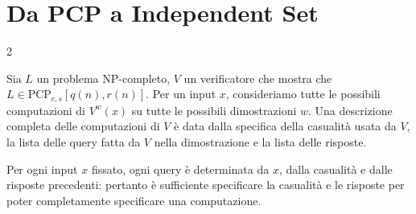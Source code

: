 \documentclass[\main/main.tex]{subfiles}
\begin{document}
\section{Da PCP a Independent Set}
\begin{multicols}{2}
\begin{definition}[Configurazione]
    Sia \(L\) un problema \(\mathrm{NP}\)-completo, \(V\) un verificatore che mostra che \(L \in \mathrm{PCP}_{c, s}[q(n), r(n)]\). Per un input \(x\), consideriamo tutte le possibili computazioni di \(V^{w}(x)\) su tutte le possibili dimostrazioni \(w\). Una descrizione completa delle computazioni di \(V\) è data dalla specifica della casualità usata da \(V\), la lista delle query fatta da \(V\) nella dimostrazione e la lista delle risposte.
    
    Per ogni input \(x\) fissato, ogni query è determinata da \(x\), dalla casualità e dalle risposte precedenti: pertanto è sufficiente specificare la casualità e le risposte per poter completamente specificare una computazione.
    

\end{definition}
\end{multicols}
\end{document}

